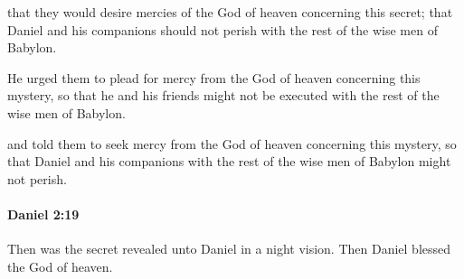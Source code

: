 			\begin{versebox}
					\item[BHS] 
					\item[LXX] 
					\item[ASV] that they would desire mercies of the God of heaven concerning this secret; that Daniel and his companions should not perish with the rest of the wise men of Babylon.
					\item[NIV] He urged them to plead for mercy from the God of heaven concerning this mystery, so that he and his friends might not be executed with the rest of the wise men of Babylon.
					\item[NRSV] and told them to seek mercy from the God of heaven concerning this mystery, so that Daniel and his companions with the rest of the wise men of Babylon might not perish.
			\end{versebox}

		\paragraph{Daniel 2:19} %
			\label{DANIEL-2-19}

			Then was the secret revealed unto Daniel in a night vision. Then Daniel blessed the God of heaven.

